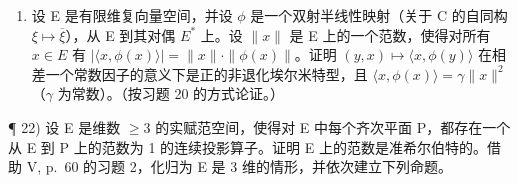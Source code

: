 \begin{enumerate}
\def\labelenumi{\arabic{enumi})}
\setcounter{enumi}{20}
\tightlist
\item
  设 E 是有限维复向量空间，并设 \(\phi\) 是一个双射半线性映射（关于 C 的自同构 \(\xi \mapsto \overline{\xi}\)），从 E 到其对偶 \(E^{*}\) 上。设 \(\| x\|\) 是 E 上的一个范数，使得对所有 \(x \in E\) 有 \(|\langle x, \phi(x) \rangle| = \| x\| \cdot \| \phi(x)\|\)。证明 \((y, x) \mapsto \langle x, \phi(y) \rangle\) 在相差一个常数因子的意义下是正的非退化埃尔米特型，且 \(\langle x, \phi(x) \rangle = \gamma \| x\|^2\)（\(\gamma\) 为常数）。（按习题 20 的方式论证。）
\end{enumerate}

¶ 22) 设 E 是维数 \(\geqslant 3\) 的实赋范空间，使得对 E 中每个齐次平面 P，都存在一个从 E 到 P 上的范数为 1 的连续投影算子。证明 E 上的范数是准希尔伯特的。借助 V, p.~60 的习题 2，化归为 E 是 3 维的情形，并依次建立下列命题。

